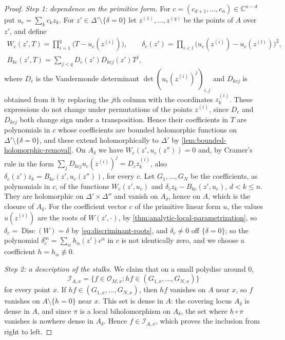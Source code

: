 \begin{proof}
\emph{Step 1: dependence on the primitive form.} For $c=(c_{d+1},\ldots,c_n)\in\mathbb C^{n-d}$ put $u_c=\sum_kc_kz_k$. For $z'\in\Delta'\setminus\{\delta=0\}$ let $z^{(1)},\ldots,z^{(q)}$ be the points of $A$ over $z'$, and define
\begin{gather*}
 W_c(z',T)=\prod_{i=1}^q\bigl(T-u_c(z^{(i)})\bigr),\qquad
 \delta_c(z')=\prod_{i<l}\bigl(u_c(z^{(i)})-u_c(z^{(l)})\bigr)^2,\\
 B_{kc}(z',T)=\sum_{j<q}D_c(z')D_{kcj}(z')T^j,
\end{gather*}
where $D_c$ is the Vandermonde determinant $\det(u_c(z^{(i)})^j)_{i,j}$ and $D_{kcj}$ is obtained from it by replacing the $j$th column with the coordinates $z_k^{(i)}$. These expressions do not change under permutations of the points $z^{(i)}$, since $D_c$ and $D_{kcj}$ both change sign under a transposition. Hence their coefficients in $T$ are polynomials in $c$ whose coefficients are bounded holomorphic functions on $\Delta'\setminus\{\delta=0\}$, and these extend holomorphically to $\Delta'$ by \cref{lem:bounded-holomorphic-removal}. On $A_\delta$ we have $W_c(z',u_c(z''))=0$ and, by Cramer's rule in the form $\sum_jD_{kcj}u_c(z^{(i)})^j=D_cz_k^{(i)}$, also $\delta_c(z')z_k=B_{kc}(z',u_c(z''))$, for every $c$. Let $G_1,\ldots,G_N$ be the coefficients, as polynomials in $c$, of the functions $W_c(z',u_c)$ and $\delta_cz_k-B_{kc}(z',u_c)$, $d<k\leq n$. They are holomorphic on $\Delta'\times\Delta''$ and vanish on $A_\delta$, hence on $A$, which is the closure of $A_\delta$. For the coefficient vector $c$ of the primitive linear form $u$, the values $u(z^{(i)})$ are the roots of $W(z',\cdot)$, by \cref{thm:analytic-local-parametrization}, so $\delta_c=\operatorname{Disc}(W)=\delta$ by \eqref{eq:discriminant-roots}, and $\delta_c\neq0$ off $\{\delta=0\}$; so the polynomial $\delta_c^m=\sum_\alpha h_\alpha(z')c^\alpha$ in $c$ is not identically zero, and we choose a coefficient $h=h_\alpha\not\equiv0$.

\emph{Step 2: a description of the stalks.} We claim that on a small polydisc around $0$,
\begin{equation}\label{eq:analytic-coherence-colon}
 \mathcal I_{A,x}=\{f\in\mathcal O_{M,x}:h f\in(G_{1,x},\ldots,G_{N,x})\}
\end{equation}
for every point $x$. If $hf\in(G_{1,x},\ldots,G_{N,x})$, then $hf$ vanishes on $A$ near $x$, so $f$ vanishes on $A\setminus\{h=0\}$ near $x$. This set is dense in $A$: the covering locus $A_\delta$ is dense in $A$, and since $\pi$ is a local biholomorphism on $A_\delta$, the set where $h\circ\pi$ vanishes is nowhere dense in $A_\delta$. Hence $f\in\mathcal I_{A,x}$, which proves the inclusion from right to left.


\end{proof}
